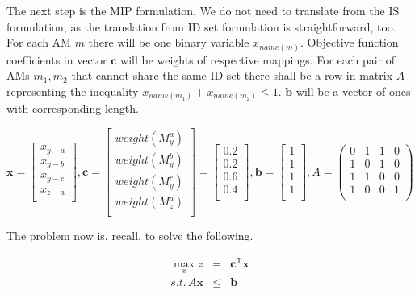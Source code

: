 The next step is the MIP formulation. We do not need to translate from the IS formulation, as the translation from ID set formulation is straightforward, too. For each AM $m$ there will be one binary variable $x_{name(m)}$. Objective function coefficients in vector $\mathbf{c}$ will be weights of respective mappings. For each pair of AMs $m_1, m_2$ that cannot share the same ID set there shall be a row in matrix $A$ representing the inequality $x_{name(m_1)} + x_{name(m_2)} \leqslant 1$. $\mathbf{b}$ will be a vector of ones with corresponding length.

\[
\mathbf{x} =
\begin{bmatrix}
x_{y-a} \\
x_{y-b} \\
x_{y-c} \\
x_{z-a} \\
\end{bmatrix},
\mathbf{c} = 
\begin{bmatrix}
weight(M_{y}^{a}) \\
weight(M_{y}^{b}) \\
weight(M_{y}^{c}) \\
weight(M_{z}^{a}) \\
\end{bmatrix} =
\begin{bmatrix}
0.2 \\
0.2 \\
0.6 \\
0.4 \\
\end{bmatrix},
\mathbf{b} =
\begin{bmatrix}
1 \\
1 \\
1 \\
1 \\
\end{bmatrix},
A =
\begin{pmatrix}
0 & 1 & 1 & 0 \\
1 & 0 & 1 & 0 \\
1 & 1 & 0 & 0 \\
1 & 0 & 0 & 1 \\
\end{pmatrix}
\]

The problem now is, recall, to solve the following.

\begin{eqnarray*}
\max_{x} z & = & \mathbf{c}^{\mathrm{T}}\mathbf{x} \\
s.t.\, A\mathbf{x} & \leqslant & \mathbf{b} \\
\end{eqnarray*}

